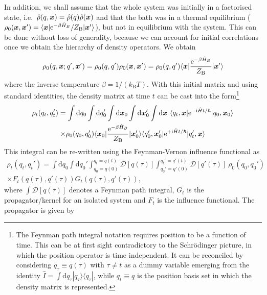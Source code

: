 In addition, we shall assume that the whole system was initially in a factorised state, i.e.~$\hat{\rho}(q,\bm{x}) = \hat{\rho}(q)\hat{\rho}(\bm{x})$ and that the bath was in a thermal equilibrium ($\rho_0(\bm{x},\bm{x}') = \langle\bm{x}|\mathrm{e}^{-\beta \hat{H}_B}/Z_\mathrm{B}|\bm{x}'\rangle $), but not in equilibrium with the system. This can be done without loss of generality, because we can account for initial correlations once we obtain the hierarchy of density operators.\supercite{Tanimura1990a} We obtain
\begin{equation}
	\rho_0(q,\bm{x}; q',\bm{x}')
	= \rho_0(q,q')\rho_0(\bm{x},\bm{x}')
	= \rho_0(q,q')\langle\bm{x}|\frac{\mathrm{e}^{-\beta \hat{H}_B}}{Z_\mathrm{B}}|\bm{x}'\rangle
	\label{eq:factorised}
\end{equation}
where the inverse temperature $\beta = 1/(k_\mathrm{B}T)$. With this initial matrix and using standard identities, the density matrix at time $t$ can be cast into the form\footnote[3]{The Feynman path integral notation requires position to be a function of time. This can be at first sight contradictory to the Schr\"odinger picture, in which the position operator is time independent. It can be reconciled by considering $q_\tau \equiv q(\tau)$ with $\tau \neq t$ as a dummy variable emerging from the identity $\hat{I}=\int\mathrm{d}q_\tau |q_\tau\rangle\langle q_\tau|$, while $q_t\equiv q$ is the position basis set in which the density matrix is represented.}
\begin{multline}
	\rho_t(q_t,q_t')=\int\mathrm{d}q_0\int\mathrm{d}q_0'
	\int\mathrm{d}\vc{x}_0
	\int\mathrm{d}\vc{x}_0'
	\int\mathrm{d}\vc{x}\ 
	\langle q_t, \vc{x}|\mathrm{e}^{-\mathrm{i}\hat{H}t/\hbar}|q_0, \vc{x}_0\rangle\\
	\times
	 \rho_0(q_0,q_0')
	 \langle\vc{x}_0|\frac{\mathrm{e}^{-\beta \hat{H}_B}}{Z_\mathrm{B}}|\vc{x}_0'\rangle
	 \langle q'_0, \vc{x}_0'|\mathrm{e}^{+\mathrm{i}\hat{H}t/\hbar}|q_t', \vc{x}\rangle
\end{multline}
This integral can be re-written using the Feynman-Vernon influence functional as\supercite{Feynman1963b}
\begin{multline}
	\rho_t(q_t,q_t')=
	\int\mathrm{d}q_0 
	\int\mathrm{d}q_0'
	\int_{q_0= q(0)}^{q_t = q(t)} \mathcal{D}[q(\tau)]
	\int_{q_0'= q'(0)}^{q_t'= q'(t)} \mathcal{D}[q'(\tau)]
	\ \rho_0(q_0,q_0')
	\\
	\times F_t(q(\tau),q'(\tau))G_t(q(\tau),q'(\tau)),
	\label{eq:rho_t}
\end{multline}
where $\int \mathcal{D}[q(\tau)]$ denotes a Feynman path integral,\supercite{Feynman2010} $G_t$ is the propagator/kernel for an isolated system and $F_t$ is the influence functional. The propagator is given by 
